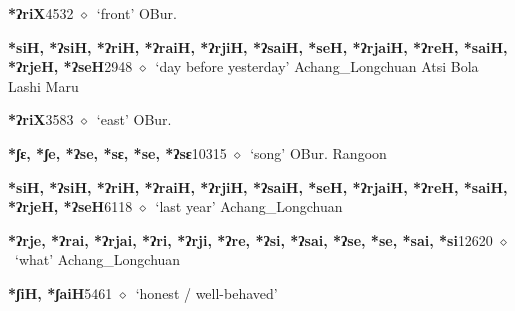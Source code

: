 \begin{list}{}{\leftmargin=1.5em \itemindent=-1.5em}
  \item {\footnotesize \textbf{*ʔriX}}{\tiny 4532}
\hspace{1ex}
         $\diamond$~`front'
         OBur. 
  \item {\footnotesize \textbf{*siH, *ʔsiH, *ʔriH, *ʔraiH, *ʔrjiH, *ʔsaiH, *seH, *ʔrjaiH, *ʔreH, *saiH, *ʔrjeH, *ʔseH}}{\tiny 2948}
\hspace{1ex}
         $\diamond$~`day before yesterday'
         Achang\_Longchuan 
\hspace{1ex}
         Atsi 
\hspace{1ex}
         Bola 
\hspace{1ex}
         Lashi 
\hspace{1ex}
         Maru 
  \item {\footnotesize \textbf{*ʔriX}}{\tiny 3583}
\hspace{1ex}
         $\diamond$~`east'
         OBur. 
  \item {\footnotesize \textbf{*ʃɛ, *ʃe, *ʔse, *sɛ, *se, *ʔsɛ}}{\tiny 10315}
\hspace{1ex}
         $\diamond$~`song'
         OBur. 
\hspace{1ex}
         Rangoon 
  \item {\footnotesize \textbf{*siH, *ʔsiH, *ʔriH, *ʔraiH, *ʔrjiH, *ʔsaiH, *seH, *ʔrjaiH, *ʔreH, *saiH, *ʔrjeH, *ʔseH}}{\tiny 6118}
\hspace{1ex}
         $\diamond$~`last year'
         Achang\_Longchuan 
  \item {\footnotesize \textbf{*ʔrje, *ʔrai, *ʔrjai, *ʔri, *ʔrji, *ʔre, *ʔsi, *ʔsai, *ʔse, *se, *sai, *si}}{\tiny 12620}
\hspace{1ex}
         $\diamond$~`what'
         Achang\_Longchuan 
  \item {\footnotesize \textbf{*ʃiH, *ʃaiH}}{\tiny 5461}
\hspace{1ex}
         $\diamond$~`honest / well-behaved'

\end{list}
